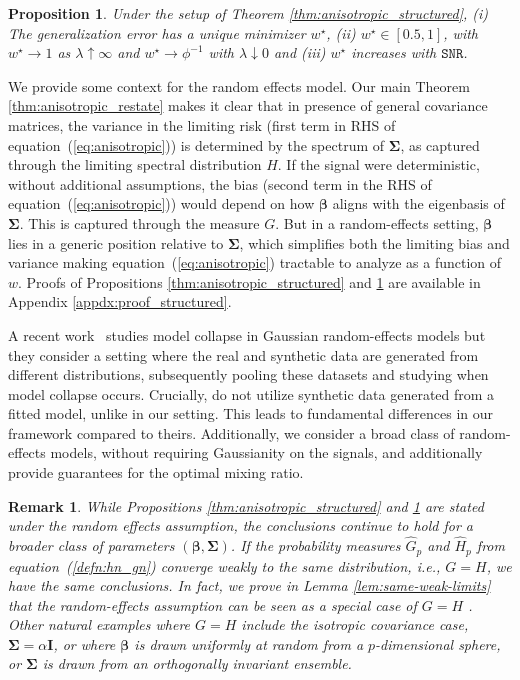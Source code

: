 \documentclass[10pt]{article}
\def\eqref#1{equation~(\ref{#1})}
\newtheorem{prop}{Proposition}
\newtheorem{remark}{Remark}
\numberwithin{thm}{section}
\numberwithin{remark}{section}
\numberwithin{ex}{section}
\numberwithin{ass}{section}
\numberwithin{defn}{section}
\numberwithin{lemma}{section}
\numberwithin{corollary}{section}
\numberwithin{prop}{section}
\def \bbeta{\pmb{\beta}}
\newcommand{\bSigma}{ { \Sigma} }
\def\bSigma{{\boldsymbol\Sigma}}
\numberwithin{equation}{section}
\renewcommand{\hat}{\widehat}
\begin{document}
\begin{prop}
  \label{thm:structured_mixing}
  Under the setup of Theorem \ref{thm:anisotropic_structured}, (i) The generalization error has a unique minimizer $w^{\star}$, (ii) $w^{\star} \in [0.5, 1]$, with $w^{\star} \to 1$ as $\lambda \uparrow \infty$ and $w^{\star} \to \phi^{-1}$ with $\lambda \downarrow 0$ and (iii) $w^{\star}$ increases with $\texttt{SNR}$.
\end{prop}
We provide some context for the random effects model.
Our main Theorem \ref{thm:anisotropic_restate} makes it clear that in presence of general covariance matrices, the variance  in the limiting risk (first term in RHS of \eqref{eq:anisotropic}) is determined by the spectrum of $\bSigma$, as captured through the limiting spectral distribution $H$. If the signal were deterministic, without additional assumptions, the bias (second term in the RHS of \eqref{eq:anisotropic}) would depend on how $\bbeta$ aligns with the eigenbasis of $\bSigma$. This is captured through the measure $G$. But in a random-effects setting, $\bbeta$ lies in a generic position relative to \(\bSigma\), which simplifies both the limiting bias and variance making \eqref{eq:anisotropic} tractable to analyze as a function of $w$. Proofs of Propositions \ref{thm:anisotropic_structured} and \ref{thm:structured_mixing} are available in Appendix \ref{appdx:proof_structured}.

A recent work~\cite{dohmatob2024strong} studies model collapse in Gaussian random-effects models but they consider a setting where the real and synthetic data are generated from different distributions, subsequently pooling these datasets and studying when model collapse occurs. Crucially, \cite{dohmatob2024strong} do not utilize synthetic data generated from a fitted model, unlike in our setting. This leads to fundamental differences in our framework compared to theirs. Additionally, we consider a broad class of random-effects models, without requiring Gaussianity on the signals, and additionally provide guarantees for the optimal mixing ratio.

\begin{remark}
  \label{rem:need_g_equal_h}
  While Propositions \ref{thm:anisotropic_structured} and \ref{thm:structured_mixing} are stated under the random effects assumption, the conclusions continue to hold for a broader class of parameters $(\bbeta,\bSigma)$. If the probability measures $\hat G_p$ and $\hat H_p$  from \eqref{defn:hn_gn} converge weakly to the same distribution, i.e., $G=H$, we have the same conclusions. In fact, we prove in Lemma \ref{lem:same-weak-limits} that the random-effects assumption can be seen as  a special case of $G=H$ . Other natural examples where $G=H$ include the isotropic covariance  case, $\bSigma= \alpha \boldsymbol I$, or where $\bbeta$ is drawn uniformly at random from a $p$-dimensional sphere, or $\bSigma$ is drawn from an orthogonally invariant ensemble.
\end{remark}
\end{document}
